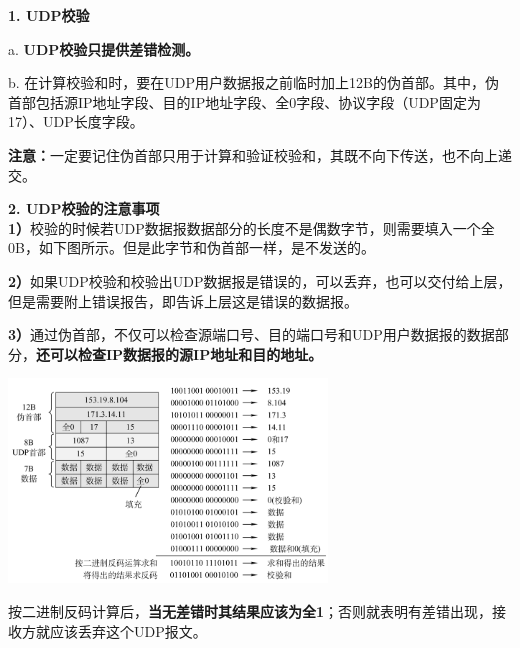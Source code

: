 \textbf{{1. UDP校验}}

{{a. }}\textbf{{{UDP校验只提供差错检测}{。}}}

b.
在计算校验和时，要在UDP用户数据报之前临时加上12B的伪首部。{其中，伪首部包括源IP地址字段、目的IP地址字段、全0字段、协议字段（UDP固定为17）、UDP长度字段。}

{\textbf{{注意：}}一定要记住伪首部只用于计算和验证校验和，其既不向下传送，也不向上递交。}

{{\textbf{2. UDP校验的注意事项}}}\\

\textbf{1）}校验的时候若UDP数据报数据部分的长度不是偶数字节，则需要填入一个全0B，如下图所示。但是此字节和伪首部一样，是不发送的。

\textbf{2）}如果UDP校验和校验出UDP数据报是错误的，可以丢弃，也可以交付给上层，但是需要附上错误报告，即告诉上层这是错误的数据报。

\textbf{3）}通过伪首部，不仅可以检查源端口号、目的端口号和UDP用户数据报的数据部分，\textbf{还可以检查IP数据报的源IP地址和目的地址。}

\includegraphics[width=3.33333in,height=2.13542in]{png-jpeg-pics/3D3FDD1E49C063F30606CFD1913A3BBA.png}

按二进制反码计算后，\textbf{当无差错时其结果应该为全1}；否则就表明有差错出现，接收方就应该丢弃这个UDP报文。
